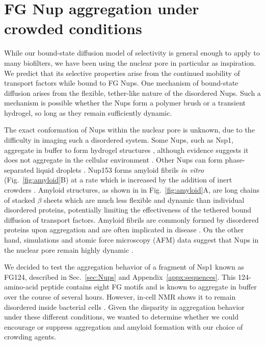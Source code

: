 \chapter{FG Nup aggregation under crowded conditions}\label{ch05}

While our bound-state diffusion model of selectivity is general enough to apply to many biofilters, we have been using the nuclear pore in particular as inspiration.  We predict that its selective properties arise from the continued mobility of transport factors while bound to FG Nups.  One mechanism of bound-state diffusion arises from the flexible, tether-like nature of the disordered Nups.  Such a mechanism is possible whether the Nups form a polymer brush or a transient hydrogel, so long as they remain sufficiently dynamic.

The exact conformation of Nups within the nuclear pore is unknown, due to the difficulty in imaging such a disordered system.  Some Nups, such as Nsp1, aggregate in buffer to form hydrogel structures \cite{frey06, frey07, ader10}, although evidence suggests it does not aggregate in the cellular environment \cite{hough15}.  Other Nups can form phase-separated liquid droplets \cite{schmidt15}.  Nup153 forms amyloid fibrils \textit{in vitro} (Fig.~\ref{fig:amyloid}B) at a rate which is increased by the addition of inert crowders \cite{milles13}.  Amyloid structures, as shown in in Fig.~\ref{fig:amyloid}A, are long chains of stacked $\beta$ sheets which are much less flexible and dynamic than individual disordered proteins, potentially limiting the effectiveness of the tethered bound diffusion of transport factors.  Amyloid fibrils are commonly formed by disordered proteins upon aggregation and are often implicated in disease \cite{jahn08}.    On the other hand, simulations and atomic force microscopy (AFM) data suggest that Nups in the nuclear pore remain highly dynamic \cite{sakiyama16,moussavi-baygi16}.

We decided to test the aggregation behavior of a fragment of Nsp1 known as FG124, described in Sec.~\ref{sec:Nups} and Appendix~\ref{appx:sequences}.  This 124-amino-acid peptide contains eight FG motifs and is known to aggregate in buffer over the course of several hours.  However, in-cell NMR shows it to remain disordered inside bacterial cells \cite{hough15}.  Given the disparity in aggregation behavior under these different conditions, we wanted to determine whether we could encourage or suppress aggregation and amyloid formation with our choice of crowding agents.

